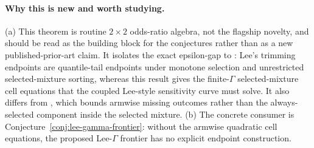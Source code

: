 \documentclass[11pt]{article}
\theoremstyle{definition}
\theoremstyle{plain}
\theoremstyle{remark}
\begin{document}
\paragraph{Why this is new and worth studying.}
(a) This theorem is routine \(2\times2\) odds-ratio algebra, not the flagship novelty, and should be read as the building block for the conjectures rather than as a new published-prior-art claim.  It isolates the exact epsilon-gap to \citet{Lee2009SampleSelection}: Lee's trimming endpoints are quantile-tail endpoints under monotone selection and unrestricted selected-mixture sorting, whereas this result gives the finite-\(\Gamma\) selected-mixture cell equations that the coupled Lee-style sensitivity curve must solve.  It also differs from \citet{ScharfsteinManskiAnthony2004Bounds}, which bounds armwise missing outcomes rather than the always-selected component inside the selected mixture.  (b) The concrete consumer is Conjecture~\ref{conj:lee-gamma-frontier}: without the armwise quadratic cell equations, the proposed Lee-\(\Gamma\) frontier has no explicit endpoint construction.
\end{document}
